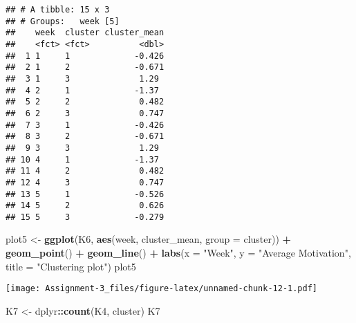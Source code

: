 \documentclass[]{article}
\newenvironment{Shaded}{\begin{snugshade}}{\end{snugshade}}
\newcommand{\DataTypeTok}[1]{\textcolor[rgb]{0.13,0.29,0.53}{#1}}
\newcommand{\KeywordTok}[1]{\textcolor[rgb]{0.13,0.29,0.53}{\textbf{#1}}}
\newcommand{\NormalTok}[1]{#1}
\newcommand{\OperatorTok}[1]{\textcolor[rgb]{0.81,0.36,0.00}{\textbf{#1}}}
\newcommand{\StringTok}[1]{\textcolor[rgb]{0.31,0.60,0.02}{#1}}
\begin{document}
\begin{Shaded}
\end{Shaded}

\begin{verbatim}
## # A tibble: 15 x 3
## # Groups:   week [5]
##    week  cluster cluster_mean
##    <fct> <fct>          <dbl>
##  1 1     1             -0.426
##  2 1     2             -0.671
##  3 1     3              1.29 
##  4 2     1             -1.37 
##  5 2     2              0.482
##  6 2     3              0.747
##  7 3     1             -0.426
##  8 3     2             -0.671
##  9 3     3              1.29 
## 10 4     1             -1.37 
## 11 4     2              0.482
## 12 4     3              0.747
## 13 5     1             -0.526
## 14 5     2              0.626
## 15 5     3             -0.279
\end{verbatim}

\begin{Shaded}
\begin{Highlighting}[]
\NormalTok{plot5 <-}\StringTok{ }\KeywordTok{ggplot}\NormalTok{(K6, }\KeywordTok{aes}\NormalTok{(week, cluster_mean, }\DataTypeTok{group =}\NormalTok{ cluster)) }\OperatorTok{+}
\StringTok{         }\KeywordTok{geom_point}\NormalTok{() }\OperatorTok{+}
\StringTok{         }\KeywordTok{geom_line}\NormalTok{() }\OperatorTok{+}
\StringTok{         }\KeywordTok{labs}\NormalTok{(}\DataTypeTok{x =} \StringTok{"Week"}\NormalTok{, }\DataTypeTok{y =} \StringTok{"Average Motivation"}\NormalTok{, }
              \DataTypeTok{title =} \StringTok{"Clustering plot"}\NormalTok{)}
\NormalTok{plot5}
\end{Highlighting}
\end{Shaded}

\texttt{[image: Assignment-3\_files/figure-latex/unnamed-chunk-12-1.pdf]}

\begin{Shaded}
\begin{Highlighting}[]
\NormalTok{K7 <-}\StringTok{ }\NormalTok{dplyr}\OperatorTok{::}\KeywordTok{count}\NormalTok{(K4, cluster)}
\NormalTok{K7}
\end{Highlighting}
\end{Shaded}
\end{document}
